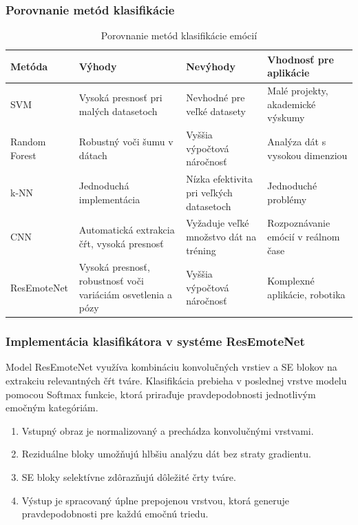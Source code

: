 \subsubsection{Porovnanie metód klasifikácie}
\begin{table}[H]
\centering
\begin{tabularx}{\textwidth}{|l|X|X|X|}
    \hline
    \textbf{Metóda} & \textbf{Výhody} & \textbf{Nevýhody} & \textbf{Vhodnosť pre aplikácie} \\ \hline
    SVM & Vysoká presnosť pri malých datasetoch & Nevhodné pre veľké datasety & Malé projekty, akademické výskumy \\ \hline
    Random Forest & Robustný voči šumu v dátach & Vyššia výpočtová náročnosť & Analýza dát s vysokou dimenziou \\ \hline
    k-NN & Jednoduchá implementácia & Nízka efektivita pri veľkých datasetoch & Jednoduché problémy \\ \hline
    CNN & Automatická extrakcia čŕt, vysoká presnosť & Vyžaduje veľké množstvo dát na tréning & Rozpoznávanie emócií v reálnom čase \\ \hline
    ResEmoteNet & Vysoká presnosť, robustnosť voči variáciám osvetlenia a pózy & Vyššia výpočtová náročnosť & Komplexné aplikácie, robotika \\ \hline
\end{tabularx}
\caption{Porovnanie metód klasifikácie emócií}
\end{table}

\subsubsection{Implementácia klasifikátora v systéme ResEmoteNet}
Model ResEmoteNet využíva kombináciu konvolučných vrstiev a SE blokov na extrakciu relevantných čŕt tváre. Klasifikácia prebieha v poslednej vrstve modelu pomocou Softmax funkcie, ktorá priraďuje pravdepodobnosti jednotlivým emočným kategóriám.

\begin{enumerate}
    \item Vstupný obraz je normalizovaný a prechádza konvolučnými vrstvami.
    \item Reziduálne bloky umožňujú hlbšiu analýzu dát bez straty gradientu.
    \item SE bloky selektívne zdôrazňujú dôležité črty tváre.
    \item Výstup je spracovaný úplne prepojenou vrstvou, ktorá generuje pravdepodobnosti pre každú emočnú triedu.
\end{enumerate}

